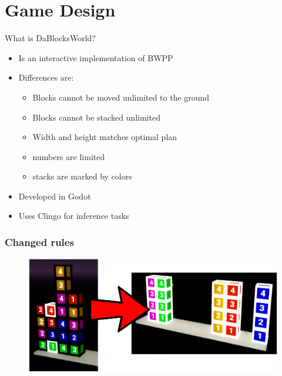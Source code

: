 \documentclass[12pt]{beamer}
\begin{document}
    \section{Game Design}
        \begin{frame}[fragile]{What is DaBlocksWorld?}
            \begin{itemize}
                \item Is an interactive implementation of BWPP
                \item Differences are: 
                \begin{itemize}
                    \item Blocks cannot be moved unlimited to the ground
                    \item Blocks cannot be stacked unlimited
                    \item Width and height matches optimal plan
                    \item numbers are limited
                    \item stacks are marked by colors
                \end{itemize}
                \item Developed in Godot
                \item Uses Clingo for inference tasks
            \end{itemize}
        \end{frame}

        \begin{frame}[fragile]
            \frametitle{Changed rules}
            \begin{figure}
                \includegraphics[width=\linewidth]{start_goal_config_colored.png}
            \end{figure} 
        \end{frame}
\end{document}
